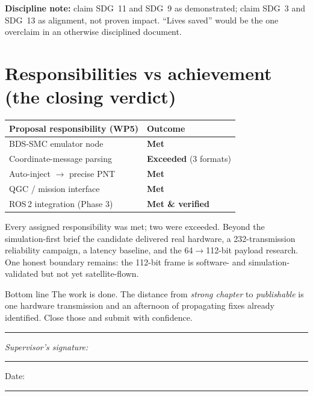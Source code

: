 \documentclass[11pt,a4paper]{article}
\begin{document}
\textbf{Discipline note:} claim SDG~11 and SDG~9 as demonstrated; claim SDG~3 and
SDG~13 as alignment, not proven impact. ``Lives saved'' would be the one overclaim in
an otherwise disciplined document.

\section*{Responsibilities vs achievement (the closing verdict)}
\begin{center}
\renewcommand{\arraystretch}{1.3}
\begin{tabular}{@{}p{8.2cm} p{4.6cm}@{}}
\toprule
\textbf{Proposal responsibility (WP5)} & \textbf{Outcome} \\
\midrule
BDS-SMC emulator node            & \textbf{\color{good}Met} \\
Coordinate-message parsing       & \textbf{\color{good}Exceeded} (3 formats) \\
Auto-inject $\rightarrow$ precise PNT & \textbf{\color{good}Met} \\
QGC / mission interface          & \textbf{\color{good}Met} \\
ROS\,2 integration (Phase 3)     & \textbf{\color{good}Met \& verified} \\
\bottomrule
\end{tabular}
\end{center}

Every assigned responsibility was met; two were exceeded. Beyond the simulation-first
brief the candidate delivered real hardware, a 232-transmission reliability campaign,
a latency baseline, and the 64$\rightarrow$112-bit payload research. One honest boundary
remains: the 112-bit frame is software- and simulation-validated but not yet
satellite-flown.

\begin{verdictbox}{Bottom line}
The work is done. The distance from \emph{strong chapter} to \emph{publishable} is one
hardware transmission and an afternoon of propagating fixes already identified. Close
those and submit with confidence.
\end{verdictbox}

\vspace{1.5em}
\hrule
\vspace{0.6em}
\emph{Supervisor's signature:}\quad\rule{5cm}{0.4pt}\hfill Date:\quad\rule{3cm}{0.4pt}
\end{document}
